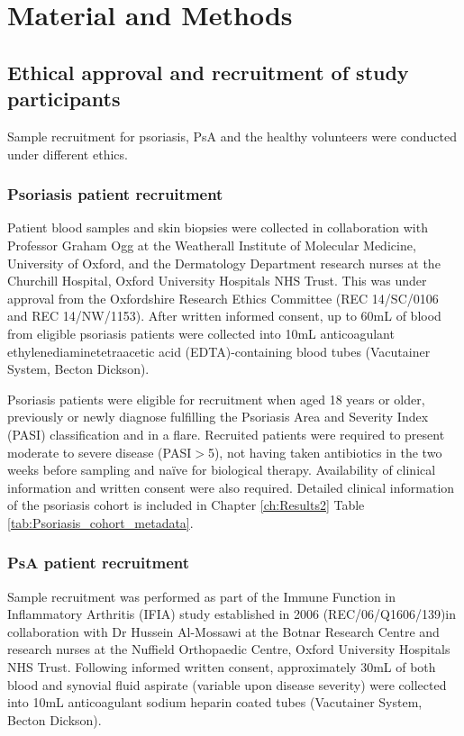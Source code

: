 \chapter{Material and Methods}
\label{ch:Mat}



\section{Ethical approval and recruitment of study participants}
Sample recruitment for psoriasis, PsA and the healthy volunteers were conducted under different ethics.


\subsection{Psoriasis patient recruitment}

Patient blood samples and skin biopsies were collected in collaboration with Professor Graham Ogg at the Weatherall Institute of Molecular Medicine, University of Oxford, and the Dermatology Department research nurses at the Churchill Hospital, Oxford University Hospitals NHS Trust. This was under approval from the Oxfordshire Research Ethics Committee (REC 14/SC/0106 and REC 14/NW/1153). After written informed consent, up to 60mL of blood from eligible psoriasis patients were collected into 10mL anticoagulant ethylenediaminetetraacetic acid (EDTA)-containing blood tubes (Vacutainer System, Becton Dickson).

Psoriasis patients were eligible for recruitment when aged 18 years or older, previously or newly diagnose fulfilling the Psoriasis Area and Severity Index (PASI) classification and in a flare. Recruited patients were required to present moderate to severe disease (PASI$>$5), not having taken antibiotics in the two weeks before sampling and na\"{i}ve for biological therapy. Availability of clinical information and written consent were also required. Detailed clinical information of the psoriasis cohort is included in Chapter \ref{ch:Results2} Table \ref{tab:Psoriasis_cohort_metadata}.



\subsection{PsA patient recruitment}

Sample recruitment was performed as part of the Immune Function in Inflammatory Arthritis (IFIA) study established in 2006 (REC/06/Q1606/139)in collaboration with Dr Hussein Al-Mossawi at the Botnar Research Centre and research nurses at the Nuffield Orthopaedic Centre, Oxford University Hospitals NHS Trust. Following informed written consent, approximately 30mL of both blood and synovial fluid aspirate (variable upon disease severity) were collected into 10mL anticoagulant sodium heparin coated tubes (Vacutainer System, Becton Dickson).

